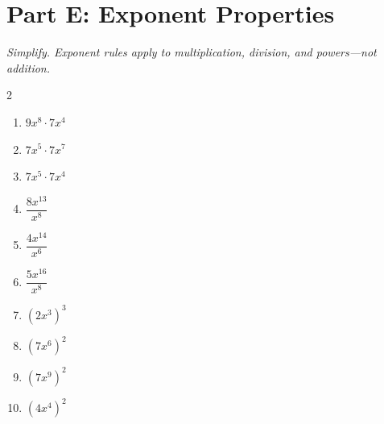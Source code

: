 \documentclass[11pt]{article}
\begin{document}
\section*{Part E: Exponent Properties}
\noindent\textit{Simplify. Exponent rules apply to multiplication, division, and powers---not addition.}
\begin{multicols}{2}
\begin{enumerate}
  \item $9x^{8} \cdot 7x^{4}$
  \vspace{1.3cm}
  \item $7x^{5} \cdot 7x^{7}$
  \vspace{1.3cm}
  \item $7x^{5} \cdot 7x^{4}$
  \vspace{1.3cm}
  \item $\dfrac{8x^{13}}{x^{8}}$
  \vspace{1.3cm}
  \item $\dfrac{4x^{14}}{x^{6}}$
  \vspace{1.3cm}
  \item $\dfrac{5x^{16}}{x^{8}}$
  \vspace{1.3cm}
  \item $(2x^{3})^{3}$
  \vspace{1.3cm}
  \item $(7x^{6})^{2}$
  \vspace{1.3cm}
  \item $(7x^{9})^{2}$
  \vspace{1.3cm}
  \item $(4x^{4})^{2}$
  \vspace{1.3cm}
\end{enumerate}
\end{multicols}
\end{document}

